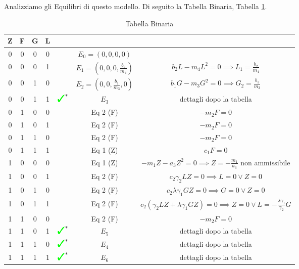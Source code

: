 \documentclass[12pt,a4paper]{article}
\numberwithin{theorem}{section}
\numberwithin{definition}{section}
\numberwithin{example}{section}
\newcommand{\cmark}{\Large\color{green}\ding{51}\color{black}\normalsize}%
\newcommand{\xmark}{\Large\color{red}\ding{55}\color{black}\normalsize}%
\begin{document}
Analizziamo gli Equilibri di questo modello. Di seguito la Tabella Binaria, Tabella \ref{tab:equilibri}.
\begin{table}[h]
	\begin{tabular}{|c|c|c|c|c|c|c|}
		\hline
		\textbf{Z} & \textbf{F}& \textbf{G} & \textbf{L} &  & &  \\
		\hline
		0 & 0 & 0 & 0 & \cmark &  $E_0=(0,0,0,0)$ & \\
		\hline
		0 & 0 & 0 & 1 & \cmark & $ E_1=(0,0,0,\frac{b_2}{m_4})$ & $b_2L-m_4L^2=0 \implies L_1= \frac{b_2}{m_4} $ \\
		\hline
		0 & 0 & 1 & 0 & \cmark & $E_2=(0,0,\frac{b_1}{m_3},0)$ & $b_1G-m_3G^2=0 \implies G_2= \frac{b_1}{m_3} $ \\
  		\hline
		0 & 0 & 1 & 1 & $\text{\cmark}^\ast$ & $E_3$ &  dettagli dopo la tabella \\
		\hline
		0 & 1 & 0 & 0 & \xmark & Eq 2 (F) & $ -m_2F=0 $ \\
  		\hline
		0 & 1 & 0 & 1 & \xmark & Eq 2 (F) &  $ -m_2F=0 $ \\
  		\hline
		0 & 1 & 1 & 0 & \xmark & Eq 2 (F) &  $ -m_2F=0 $ \\
  		\hline
		0 & 1 & 1 & 1 & \xmark & Eq 1 (Z)  & $ c_1 F=0 $ \\





  
		\hline
		1 & 0 & 0 & 0 & \xmark & Eq 1 (Z)  & $ -m_1Z-a_3Z^2=0\implies Z=-\frac{m_1}{a_3}$  non ammissibile\\
		\hline
		1 & 0 & 0 & 1 & \xmark & Eq 2 (F) & $  c_2\gamma_2LZ=0 \implies L=0 \vee Z=0$ \\
  		\hline
		1 & 0 & 1 & 0 & \xmark & Eq 2 (F) & $  c_2\lambda \gamma_1 GZ=0 \implies G=0 \vee Z=0$ \\
  		\hline
		1 & 0 & 1 & 1 & \xmark & Eq 2 (F) &  $ c_2(\gamma_2 LZ+\lambda \gamma_1 GZ)=0 \implies Z=0 \vee L=-\frac{\lambda\gamma_1}{\gamma_2} G$ \\
		\hline
		1 & 1 & 0 & 0 & \xmark & Eq 2 (F) & $ -m_2F=0 $ \\

	\hline
	1 & 1 & 0 & 1 &  $\text{\cmark}^\ast$ &$E_5$ &  dettagli dopo la tabella \\
	\hline
	1 & 1 & 1 & 0 &  $\text{\cmark}^\ast$ & $E_4$ &  dettagli dopo la tabella \\
	\hline
	1 & 1 & 1 & 1 &  $\text{\cmark}^\ast$ & $E_6$ &  dettagli dopo la tabella \\
		\hline
	\end{tabular}
 \caption{Tabella Binaria}
 \label{tab:equilibri}
\end{table}
\end{document}
